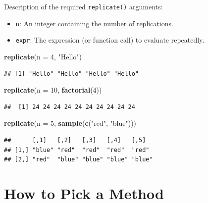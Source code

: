 \documentclass[
]{book}
\newenvironment{Shaded}{\begin{snugshade}}{\end{snugshade}}
\newcommand{\DataTypeTok}[1]{\textcolor[rgb]{0.13,0.29,0.53}{#1}}
\newcommand{\DecValTok}[1]{\textcolor[rgb]{0.00,0.00,0.81}{#1}}
\newcommand{\KeywordTok}[1]{\textcolor[rgb]{0.13,0.29,0.53}{\textbf{#1}}}
\newcommand{\NormalTok}[1]{#1}
\newcommand{\StringTok}[1]{\textcolor[rgb]{0.31,0.60,0.02}{#1}}
\providecommand{\tightlist}{%
  \setlength{\itemsep}{0pt}\setlength{\parskip}{0pt}}
\begin{document}
Description of the required \texttt{replicate()} arguments:

\begin{itemize}
\tightlist
\item
  \texttt{n}: An integer containing the number of replications.
\item
  \texttt{expr}: The expression (or function call) to evaluate repeatedly.
\end{itemize}

\begin{Shaded}
\begin{Highlighting}[]
\KeywordTok{replicate}\NormalTok{(}\DataTypeTok{n =} \DecValTok{4}\NormalTok{, }\StringTok{"Hello"}\NormalTok{)}
\end{Highlighting}
\end{Shaded}

\begin{verbatim}
## [1] "Hello" "Hello" "Hello" "Hello"
\end{verbatim}

\begin{Shaded}
\begin{Highlighting}[]
\KeywordTok{replicate}\NormalTok{(}\DataTypeTok{n =} \DecValTok{10}\NormalTok{, }\KeywordTok{factorial}\NormalTok{(}\DecValTok{4}\NormalTok{))}
\end{Highlighting}
\end{Shaded}

\begin{verbatim}
##  [1] 24 24 24 24 24 24 24 24 24 24
\end{verbatim}

\begin{Shaded}
\begin{Highlighting}[]
\KeywordTok{replicate}\NormalTok{(}\DataTypeTok{n =} \DecValTok{5}\NormalTok{, }\KeywordTok{sample}\NormalTok{(}\KeywordTok{c}\NormalTok{(}\StringTok{"red"}\NormalTok{, }\StringTok{"blue"}\NormalTok{)))}
\end{Highlighting}
\end{Shaded}

\begin{verbatim}
##      [,1]   [,2]   [,3]   [,4]   [,5]  
## [1,] "blue" "red"  "red"  "red"  "red" 
## [2,] "red"  "blue" "blue" "blue" "blue"
\end{verbatim}

\hypertarget{how-to-pick-a-method}{%
\section{How to Pick a Method}\label{how-to-pick-a-method}}
\end{document}
